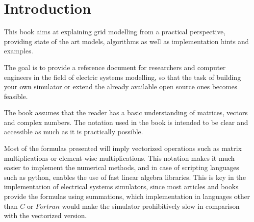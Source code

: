 \documentclass[nols,a4paper,twoside,notoc,fleqn]{tufte-book}
\newcommand{\monthyear}{%
  \ifcase\month\or January\or February\or March\or April\or May\or June\or
  July\or August\or September\or October\or November\or
  December\fi\space\number\year
}
\begin{document}
\newpage
%
%
%
%



\tableofcontents

\listoffigures

\listoftables


\mainmatter
\chapter{Introduction}

This book aims at explaining grid modelling from a practical perspective, providing state of the art models, algorithms as well as implementation hints and examples.

The goal is to provide a reference document for researchers and computer engineers in the field of electric systems modelling, so that the task of building your own simulator or extend the already available open source ones becomes feasible.

The book assumes that the reader has a basic understanding of matrices, vectors and complex numbers. The notation used in the book is intended to be clear and accessible as much as it is practically possible.

Most of the formulas presented will imply vectorized operations such as matrix multiplications or element-wise multiplications. This notation makes it much easier to implement the numerical methods, and in case of scripting languages such as python, enables the use of fast linear algebra libraries. This is key in the implementation of electrical systems simulators, since most articles and books provide the formulas using summations, which implementation in languages other than $C$ or $Fortran$ would make the simulator prohibitively slow in comparison with the vectorized version.
\end{document}
